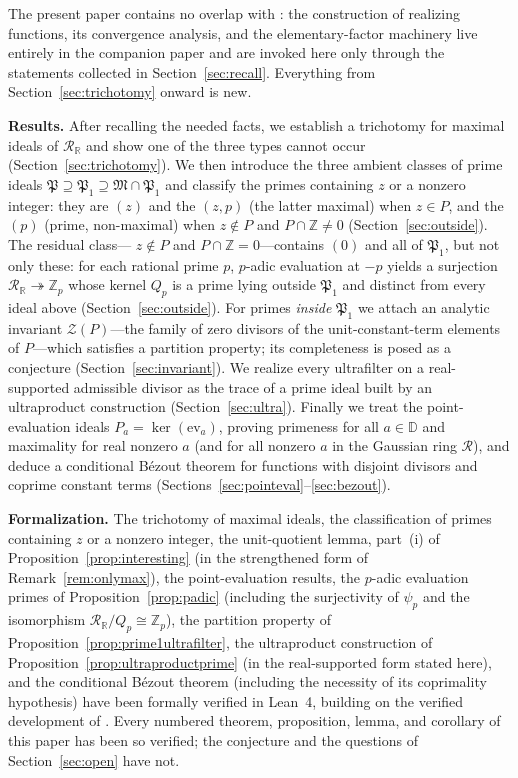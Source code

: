 \documentclass[12pt]{amsart}
\theoremstyle{definition}
\newcommand{\D}{\mathbb{D}}
\newcommand{\Z}{\mathbb{Z}}
\newcommand{\mR}{\mathcal{R}}
\newcommand{\mRR}{\mathcal{R}_{\mathbb{R}}}
\begin{document}
The present paper contains no overlap with \cite{PaperI}: the
construction of realizing functions, its convergence analysis, and the
elementary-factor machinery live entirely in the companion paper and are
invoked here only through the statements collected in
Section~\ref{sec:recall}.  Everything from Section~\ref{sec:trichotomy}
onward is new.

\medskip\noindent\textbf{Results.}
After recalling the needed facts, we establish a trichotomy for maximal
ideals of $\mRR$ and show one of the three types cannot occur
(Section~\ref{sec:trichotomy}).  We then introduce the three ambient
classes of prime ideals $\mathfrak{P} \supseteq \mathfrak{P}_1 \supseteq
\mathfrak{M} \cap \mathfrak{P}_1$ and classify the primes containing $z$
or a nonzero integer: they are $(z)$ and the $(z,p)$ (the latter maximal)
when $z \in P$, and the $(p)$ (prime, non-maximal) when $z \notin P$ and
$P \cap \Z \neq 0$ (Section~\ref{sec:outside}).  The residual class---%
$z \notin P$ and $P \cap \Z = 0$---contains $(0)$ and all of
$\mathfrak{P}_1$, but not only these: for each rational prime $p$,
$p$-adic evaluation at $-p$ yields a surjection $\mRR \twoheadrightarrow
\Z_p$ whose kernel $Q_p$ is a prime lying outside $\mathfrak{P}_1$ and
distinct from every ideal above (Section~\ref{sec:outside}).  For primes
\emph{inside} $\mathfrak{P}_1$ we attach an analytic invariant
$\mathcal{Z}(P)$---the family of zero divisors of the unit-constant-term
elements of $P$---which satisfies a partition property; its completeness
is posed as a conjecture (Section~\ref{sec:invariant}).  We realize every
ultrafilter on a real-supported admissible divisor as the trace of a
prime ideal built by an ultraproduct construction
(Section~\ref{sec:ultra}).  Finally we treat the point-evaluation ideals
$P_a = \ker(\mathrm{ev}_a)$, proving primeness for all $a \in \D$ and
maximality for real nonzero $a$ (and for all nonzero $a$ in the Gaussian
ring $\mR$), and deduce a conditional B\'ezout theorem for functions with
disjoint divisors and coprime constant terms
(Sections~\ref{sec:pointeval}--\ref{sec:bezout}).

\medskip\noindent\textbf{Formalization.}
The trichotomy of maximal ideals, the classification of primes containing
$z$ or a nonzero integer, the unit-quotient lemma, part~(i) of
Proposition~\ref{prop:interesting} (in the strengthened form of
Remark~\ref{rem:onlymax}), the point-evaluation results, the
$p$-adic evaluation primes of Proposition~\ref{prop:padic} (including the
surjectivity of $\psi_p$ and the isomorphism $\mRR/Q_p \cong \Z_p$), the
partition property of Proposition~\ref{prop:prime1ultrafilter}, the
ultraproduct construction of Proposition~\ref{prop:ultraproductprime}
(in the real-supported form stated here), and the conditional B\'ezout
theorem (including the necessity of its coprimality hypothesis) have been
formally verified in Lean~4, building on the verified development of
\cite{PaperI}.  Every numbered theorem, proposition, lemma, and corollary
of this paper has been so verified; the conjecture and the questions of
Section~\ref{sec:open} have not.
\end{document}
